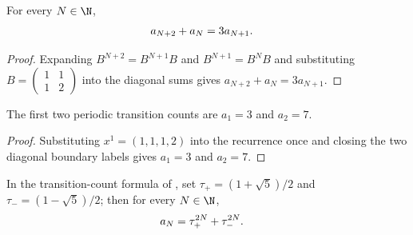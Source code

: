 \begin{lemma}
    \label{thm:cpsv_fibonacci_periodic_count_recurrence}
    \leanok
    For every $N\in\N$,
    \begin{align}
        a_{N+2}+a_N & =3a_{N+1}.
        \notag
    \end{align}
\end{lemma}

\begin{proof}
    \leanok
    Expanding $B^{N+2}=B^{N+1}B$ and $B^{N+1}=B^NB$ and substituting
    $B=\left(\begin{smallmatrix}1&1\\1&2\end{smallmatrix}\right)$ into the
    diagonal sums gives $a_{N+2}+a_N=3a_{N+1}$.
\end{proof}

\begin{lemma}
    \label{thm:cpsv_fibonacci_periodic_count_values}
    \leanok
    The first two periodic transition counts are $a_1=3$ and $a_2=7$.
\end{lemma}

\begin{proof}
    \leanok
    Substituting $x^1=(1,1,1,2)$ into the recurrence once and closing the two
    diagonal boundary labels gives $a_1=3$ and $a_2=7$.
\end{proof}

\begin{lemma}
    \label{thm:cpsv_fibonacci_periodic_count_golden_ratio}
    \leanok
    In the transition-count formula of
    \cite[Appendix~D, lines~2146--2176]{Cirac2016MPDO_arXiv}, set
    $\tau_+=(1+\sqrt5)/2$ and $\tau_-=(1-\sqrt5)/2$; then for every
    $N\in\N$,
    \begin{align}
        a_N & =\tau_+^{2N}+\tau_-^{2N}.
        \notag
    \end{align}
\end{lemma}

